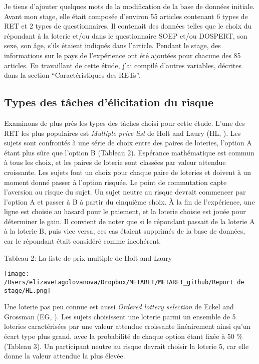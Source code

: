 \documentclass[12pt]{article}
\begin{document}
Je tiens d'ajouter quelques mots de la modification de la base de
données initiale. Avant mon stage, elle était composée d'environ 55
articles contenant 6 types de RET et 2 types de questionnaires. Il
contenait des données telles que le choix du répondant à la loterie
et/ou dans le questionnaire SOEP et/ou DOSPERT, son sexe, son âge, s'ils
étaient indiqués dans l'article. Pendant le stage, des informations sur
le pays de l'expérience ont été ajoutées pour chacune des 85 articles.
En travaillant de cette étude, j'ai compilé d'autres variables, décrites
dans la section ``Caractéristiques des RETs''.

\subsection{Types des tâches d'élicitation du risque}

Examinons de plus près les types des tâches choisi pour cette étude.
L'une des RET les plus populaires est \emph{Multiple price list} de Holt
and Laury (HL, \citet{Holt2002}). Les sujets sont confrontés à une série
de choix entre des paires de loteries, l'option A étant plus sûre que
l'option B (Tableau 2). Espérance mathématique est commun à tous les
choix, et les paires de loterie sont classées par valeur attendue
croissante. Les sujets font un choix pour chaque paire de loteries et
doivent à un moment donné passer à l'option risquée. Le point de
commutation capte l'aversion au risque du sujet. Un sujet neutre au
risque devrait commencer par l'option A et passer à B à partir du
cinquième choix. À la fin de l'expérience, une ligne est choisie au
hasard pour le paiement, et la loterie choisie est jouée pour déterminer
le gain. Il convient de noter que si le répondant passait de la loterie
A à la loterie B, puis vice versa, ces cas étaient supprimés de la base
de données, car le répondant était considéré comme incohérent.

Tableau 2: La liste de prix multiple de Holt and Laury

\hfil \texttt{[image: /Users/elizavetagolovanova/Dropbox/METARET/METARET\_github/Report de stage/HL.png]}
\hfil

Une loterie pas peu connue est aussi \emph{Ordered lottery selection} de
Eckel and Grossman (EG, \citet{Eckel2002}). Les sujets choisissent une
loterie parmi un ensemble de 5 loteries caractérisées par une valeur
attendue croissante linéairement ainsi qu'un écart type plus grand, avec
la probabilité de chaque option étant fixée à 50 \% (Tableau 3). Un
participant neutre au risque devrait choisir la loterie 5, car elle
donne la valeur attendue la plus élevée.
\end{document}
